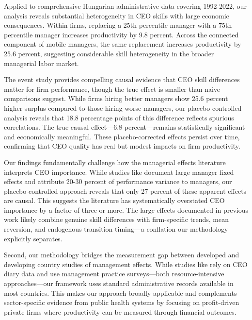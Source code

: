 \documentclass[11pt,a4paper]{article}
\begin{document}
Applied to comprehensive Hungarian administrative data covering 1992-2022, our analysis reveals substantial heterogeneity in CEO skills with large economic consequences. Within firms, replacing a 25th percentile manager with a 75th percentile manager increases productivity by 9.8 percent. Across the connected component of mobile managers, the same replacement increases productivity by 25.6 percent, suggesting considerable skill heterogeneity in the broader managerial labor market.

The event study provides compelling causal evidence that CEO skill differences matter for firm performance, though the true effect is smaller than naive comparisons suggest. While firms hiring better managers show 25.6 percent higher surplus compared to those hiring worse managers, our placebo-controlled analysis reveals that 18.8 percentage points of this difference reflects spurious correlations. The true causal effect---6.8 percent---remains statistically significant and economically meaningful. These placebo-corrected effects persist over time, confirming that CEO quality has real but modest impacts on firm productivity.

Our findings fundamentally challenge how the managerial effects literature interprets CEO importance. While studies like \citet{Bertrand2003-io} document large manager fixed effects and \citet{metcalfe2023managers} attribute 20-30 percent of performance variance to managers, our placebo-controlled approach reveals that only 27 percent of these apparent effects are causal. This suggests the literature has systematically overstated CEO importance by a factor of three or more. The large effects documented in previous work likely combine genuine skill differences with firm-specific trends, mean reversion, and endogenous transition timing---a conflation our methodology explicitly separates.

Second, our methodology bridges the measurement gap between developed and developing country studies of management effects. While studies like \citet{bandiera2020ceo} rely on CEO diary data and \citet{bloom2013does} use management practice surveys---both resource-intensive approaches---our framework uses standard administrative records available in most countries. This makes our approach broadly applicable and complements sector-specific evidence from public health systems \citep{janke2024role, munoz2024leadership} by focusing on profit-driven private firms where productivity can be measured through financial outcomes.
\end{document}

